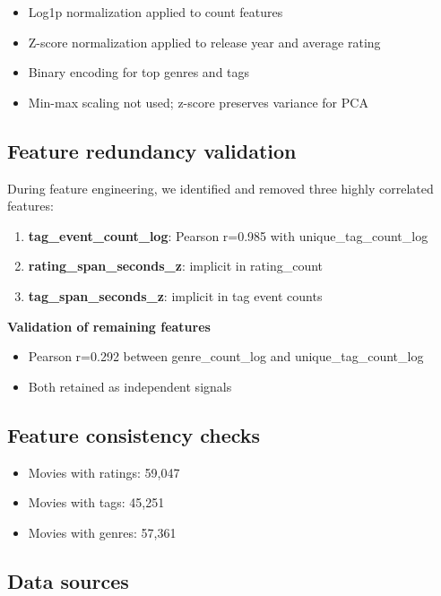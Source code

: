 \documentclass[11pt]{article}
\begin{document}
\begin{itemize}[leftmargin=1.5em]
    \item Log1p normalization applied to count features
    \item Z-score normalization applied to release year and average rating
    \item Binary encoding for top genres and tags
    \item Min-max scaling not used; z-score preserves variance for PCA
\end{itemize}

\subsection{Feature redundancy validation}

During feature engineering, we identified and removed three highly correlated features:

\begin{enumerate}[leftmargin=1.5em]
    \item \textbf{tag\_event\_count\_log}: Pearson r=0.985 with unique\_tag\_count\_log
    \item \textbf{rating\_span\_seconds\_z}: implicit in rating\_count
    \item \textbf{tag\_span\_seconds\_z}: implicit in tag event counts
\end{enumerate}

\textbf{Validation of remaining features}

\begin{itemize}[leftmargin=1.5em]
    \item Pearson r=0.292 between genre\_count\_log and unique\_tag\_count\_log
    \item Both retained as independent signals
\end{itemize}

\subsection{Feature consistency checks}

\begin{itemize}[leftmargin=1.5em]
    \item Movies with ratings: 59,047
    \item Movies with tags: 45,251
    \item Movies with genres: 57,361
\end{itemize}

\subsection{Data sources}
\end{document}
